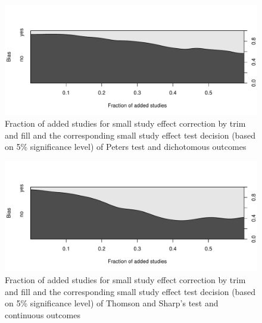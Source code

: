\documentclass[11pt,a4paper,twoside]{book}\usepackage[]{graphicx}\usepackage[]{color}
\newenvironment{knitrout}{}{} %
\begin{document}
\begin{figure}
\begin{knitrout}
\color{fgcolor}

{\centering \includegraphics[width=\textwidth-3cm]{figure/ch02_figunnamed-chunk-27-1} 

}



\end{knitrout}
\caption{Fraction of added studies for small study effect correction by trim and fill and the corresponding small study effect test decision (based on 5\% significance level) of Peters test and dichotomous outcomes}
\label{trimfill.pvalues.bin}
\end{figure}

\begin{figure}
\begin{knitrout}
\color{fgcolor}

{\centering \includegraphics[width=\textwidth-3cm]{figure/ch02_figunnamed-chunk-28-1} 

}



\end{knitrout}
\caption{Fraction of added studies for small study effect correction by trim and fill and the corresponding small study effect test decision (based on 5\% significance level) of Thomson and Sharp's test and continuous outcomes}
\label{trimfill.pvalues.cont}
\end{figure}
\end{document}
